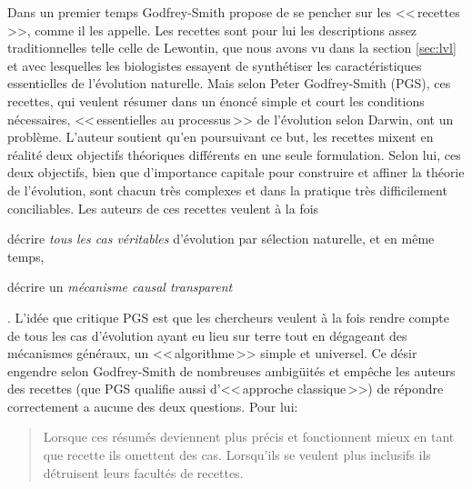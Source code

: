 Dans un premier temps Godfrey-Smith propose de se pencher sur les <<\,recettes\,>>, comme il les appelle. Les recettes sont pour lui les descriptions assez traditionnelles telle celle de Lewontin, que nous avons vu dans la section \ref{sec:lvl} et avec lesquelles les biologistes essayent de synthétiser les caractéristiques essentielles de l'évolution naturelle. Mais selon Peter Godfrey-Smith (PGS), ces recettes, qui veulent résumer dans un énoncé simple et court les conditions nécessaires, <<\,essentielles au processus\,>> de l'évolution selon Darwin, ont un problème. L'auteur soutient qu'en poursuivant ce but, les recettes mixent en réalité deux objectifs théoriques différents en une seule formulation. Selon lui, ces deux objectifs, bien que d'importance capitale pour construire et affiner la théorie de l'évolution, sont chacun très complexes et dans la pratique très difficilement conciliables. Les auteurs de ces recettes veulent à la fois \begin{inparaenum} \item décrire \emph{tous les cas véritables} d'évolution par sélection naturelle, et en même temps, \item décrire un \emph{mécanisme causal transparent}\end{inparaenum}. L'idée que critique PGS est que les chercheurs veulent à la fois rendre compte de tous les cas d'évolution ayant eu lieu sur terre tout en dégageant des mécanismes généraux, un <<\,algorithme\,>> simple et universel. Ce désir engendre selon Godfrey-Smith de nombreuses ambigüités et empêche les auteurs des recettes (que PGS qualifie aussi d'<<\,approche classique\,>>) de répondre correctement a aucune des deux questions. Pour lui:
	\begin{quote}
		Lorsque ces résumés deviennent plus précis et fonctionnent mieux en tant que recette ils omettent des cas. Lorsqu'ils se veulent plus inclusifs ils détruisent leurs facultés de recettes.
		\citep[p.~27]{godfrey2009darwinian}
	\end{quote}

